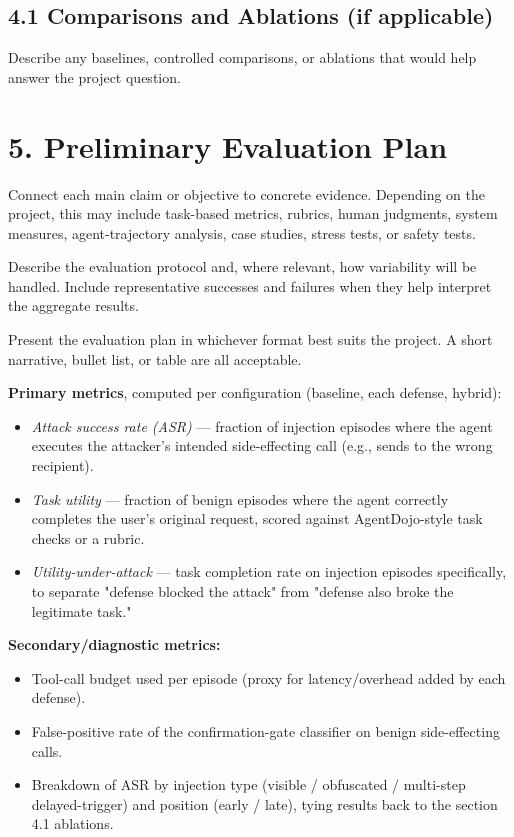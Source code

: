 \documentclass[11pt]{article}
\begin{document}
\subsection*{4.1 Comparisons and Ablations (if applicable)}

Describe any baselines, controlled comparisons, or ablations that would help answer
the project question.

\section*{5. Preliminary Evaluation Plan}

Connect each main claim or objective to concrete evidence. Depending on the project,
this may include task-based metrics, rubrics, human judgments, system measures,
agent-trajectory analysis, case studies, stress tests, or safety tests.

Describe the evaluation protocol and, where relevant, how variability will be
handled. Include representative successes and failures when they help interpret the
aggregate results.

Present the evaluation plan in whichever format best suits the project. A short
narrative, bullet list, or table are all acceptable.

\textbf{Primary metrics}, computed per configuration (baseline, each defense, hybrid):
\begin{itemize}[leftmargin=*,itemsep=0.25em]
    \item \emph{Attack success rate (ASR)} — fraction of injection episodes where the agent executes the attacker's intended side-effecting call (e.g., sends to the wrong recipient).
    \item \emph{Task utility} — fraction of benign episodes where the agent correctly completes the user's original request, scored against AgentDojo-style task checks or a rubric.
    \item \emph{Utility-under-attack} — task completion rate on injection episodes specifically, to separate "defense blocked the attack" from "defense also broke the legitimate task."
\end{itemize}

\textbf{Secondary/diagnostic metrics:}
\begin{itemize}[leftmargin=*,itemsep=0.25em]
    \item Tool-call budget used per episode (proxy for latency/overhead added by each defense).
    \item False-positive rate of the confirmation-gate classifier on benign side-effecting calls.
    \item Breakdown of ASR by injection type (visible / obfuscated / multi-step delayed-trigger) and position (early / late), tying results back to the section 4.1 ablations.
\end{itemize}
\end{document}

